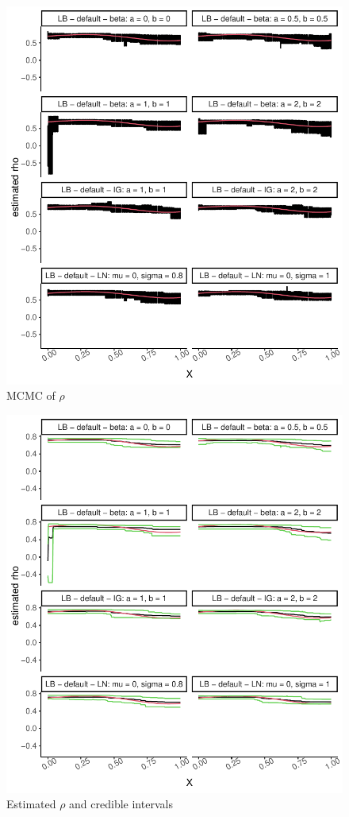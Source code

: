 \documentclass{amsart}
\begin{document}
\begin{figure}[ht]
	\centering
	\includegraphics[width=0.95\linewidth]{mcmc_rho_5.pdf}
	\caption{MCMC of $\rho$}
	\label{fig:mcmc:rho:5}
\end{figure}

\begin{figure}[ht]
	\centering
	\includegraphics[width=0.95\linewidth]{predicted_rho_5.pdf}
	\caption{Estimated $\rho$ and credible intervals}
	\label{fig:pred:rho:5}
\end{figure}
\end{document}
